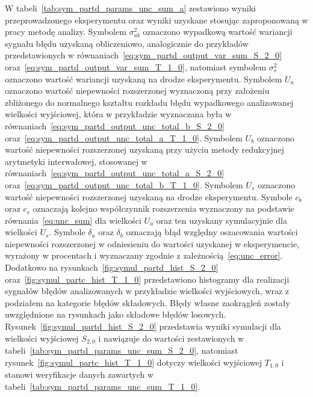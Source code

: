 W tabeli~\ref{tab:sym_partd_params_unc_sum_a} zestawiono wyniki przeprowadzonego eksperymentu oraz wyniki uzyskane stosując zaproponowaną w pracy metodę analizy. Symbolem $\sigma_{ab}^{2}$ oznaczono wypadkową wartość wariancji sygnału błędu uzyskaną obliczeniowo, analogicznie do przykładów przedstawionych w równaniach~\eqref{eq:sym_partd_output_var_sum_S_2_0} oraz~\eqref{eq:sym_partd_output_var_sum_T_1_0}, natomiast symbolem $\sigma_{s}^{2}$ oznaczono wartość wariancji uzyskaną na drodze eksperymentu. Symbolem $U_{a}$ oznaczono wartość niepewności rozszerzonej wyznaczoną przy założeniu zbliżonego do normalnego kształtu rozkładu błędu wypadkowego analizowanej wielkości wyjściowej, która w przykładzie wyznaczana była w równaniach~\eqref{eq:sym_partd_output_unc_total_b_S_2_0} oraz~\eqref{eq:sym_partd_output_unc_total_a_T_1_0}. Symbolem $U_{b}$ oznaczono wartość niepewności rozszerzonej uzyskaną przy użyciu metody redukcyjnej arytmetyki interwałowej, stosowanej w równaniach~\eqref{eq:sym_partd_output_unc_total_a_S_2_0} oraz~\eqref{eq:sym_partd_output_unc_total_b_T_1_0}. Symbolem $U_{s}$ oznaczono wartość niepewności rozszerzonej uzyskaną na drodze eksperymentu. Symbole $c_{b}$ oraz $c_{s}$ oznaczają kolejno współczynnik rozszerzenia wyznaczony na podstawie równania~\eqref{eq:unc_sum} dla wielkości $U_{a}$ oraz ten uzyskany symulacyjnie dla wielkości $U_{s}$. Symbole $\delta_{a}$ oraz $\delta_{b}$ oznaczają błąd względny oszacowania wartości niepewności rozszerzonej w odniesieniu do wartości uzyskanej w eksperymencie, wyrażony w procentach i wyznaczany zgodnie z zależnością~\eqref{eq:unc_error}. Dodatkowo na rysunkach~\ref{fig:symul_partd_hist_S_2_0} oraz~\ref{fig:symul_partc_hist_T_1_0} przedstawiono histogramy dla realizacji sygnałów błędów analizowanych w przykładzie wielkości wyjściowych, wraz z podziałem na kategorie błędów składowych. Błędy własne zaokrągleń zostały uwzględnione na rysunkach jako składowe błędów losowych. Rysunek~\ref{fig:symul_partd_hist_S_2_0} przedstawia wyniki symulacji dla wielkości wyjściowej $S_{2,0}$ i nawiązuje do wartości zestawionych w tabeli~\ref{tab:sym_partd_params_unc_sum_S_2_0}, natomiast rysunek~\ref{fig:symul_partc_hist_T_1_0} dotyczy wielkości wyjściowej $T_{1,0}$ i stanowi weryfikacje danych zawartych w tabeli~\ref{tab:sym_partd_params_unc_sum_T_1_0}.

